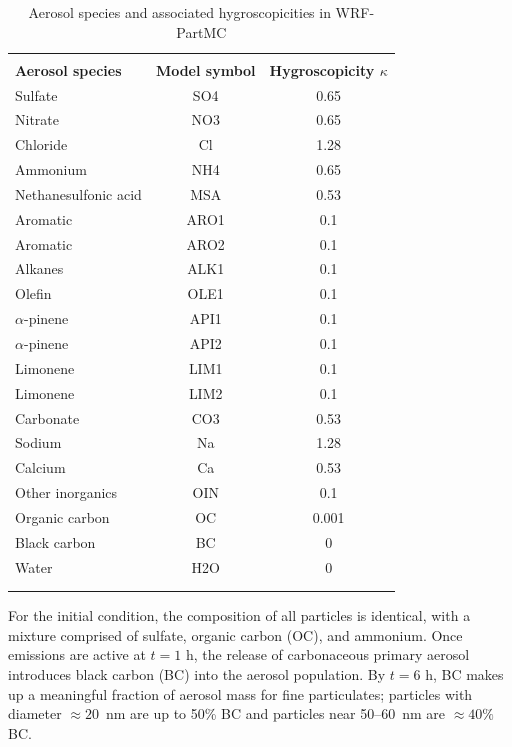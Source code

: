 \begin{table}[!t]
\centering
\caption{Aerosol species and associated hygroscopicities in WRF-PartMC}
\begin{tabular*}{.6\linewidth}{@{\extracolsep{\fill}} lcc}
\\[-2ex]\hline 
     \hline \\[-2ex] \textbf{Aerosol species} & \textbf{Model symbol} & \textbf{Hygroscopicity $\kappa$} \\
\midrule
Sulfate & SO4 & 0.65 \\
Nitrate & NO3 & 0.65 \\
Chloride & Cl & 1.28 \\
Ammonium & NH4 & 0.65 \\
Nethanesulfonic acid & MSA & 0.53 \\
Aromatic & ARO1 & 0.1 \\
Aromatic & ARO2 & 0.1 \\
Alkanes & ALK1 & 0.1 \\
Olefin & OLE1 & 0.1 \\
$\alpha$-pinene & API1 & 0.1 \\
$\alpha$-pinene & API2 & 0.1 \\
Limonene & LIM1 & 0.1 \\
Limonene & LIM2 & 0.1 \\
Carbonate & CO3 & 0.53 \\
Sodium & Na & 1.28 \\
Calcium & Ca & 0.53 \\
Other inorganics & OIN & 0.1 \\
Organic carbon & OC & 0.001 \\
Black carbon & BC & 0 \\
Water & H2O & 0 \\
\\[-2ex]\hline 
     \hline \\[-2ex]
\end{tabular*}
\label{table:wrf-partmc-species}
\end{table}

For the initial condition, the composition of all particles is identical, with a mixture comprised of sulfate, organic carbon (OC), and ammonium. Once emissions are active at $t=1$ h, the release of carbonaceous primary aerosol introduces black carbon (BC) into the aerosol population.  By $t=6$ h, BC makes up a meaningful fraction of aerosol mass for fine particulates; particles with diameter $\approx20$~nm are up to 50\% BC and particles near 50--60~nm are $\approx40\%$ BC.

